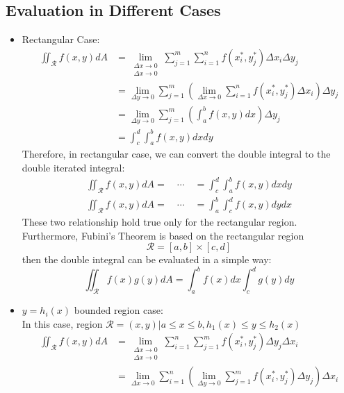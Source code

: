 \documentclass[UTF8,a4paper, 10pt, openany]{book}
\begin{document}
\subsection{Evaluation in Different Cases}
\begin{itemize}
\item Rectangular Case:
\begin{align*}
\iint_{\mathcal{R}}f(x,y)dA &= \lim_{\substack{\Delta x\to 0\\ \Delta x\to 0}}\displaystyle\sum_{j=1}^{m}\displaystyle\sum_{i=1}^{n} f(x_i^*,y_j^*)\Delta x_{i}\Delta y_{j}\\
&= \lim_{\Delta y\to 0}\displaystyle\sum_{j=1}^{m}\left(\lim_{\Delta x\to 0}\displaystyle\sum_{i=1}^{n} f(x_i^*,y_j^*)\Delta x_{i} \right)\Delta y_{j}\\
&= \lim_{\Delta y\to 0}\displaystyle\sum_{j=1}^{m}\left(\displaystyle\int_{a}^{b}f(x,y)dx \right)\Delta y_{j}\\
&= \displaystyle\int_{c}^{d}\displaystyle\int_{a}^{b}f(x,y)dxdy
\end{align*}
Therefore, in rectangular case, we can convert the double integral to the double iterated integral:
\begin{align*}
\iint_{\mathcal{R}}f(x,y)dA =\quad \cdots \quad=\displaystyle\int_{c}^{d}\displaystyle\int_{a}^{b}f(x,y)dxdy \\
\iint_{\mathcal{R}}f(x,y)dA =\quad \cdots \quad=\displaystyle\int_{a}^{b}\displaystyle\int_{c}^{d}f(x,y)dydx
\end{align*}
These two relationship hold true only for the rectangular region.\\
Furthermore, Fubini's Theorem is based on the rectangular region
$$\mathcal{R}=[a,b]\times [c,d]$$
then the double integral can be evaluated in a simple way:
$$\iint_{\mathcal{R}}f(x)g(y)dA=\int_{a}^{b}f(x)dx\int_{c}^{d}g(y)dy$$
\item $y=h_{i}(x)$ bounded region case:\\
In this case, region $\mathcal{R}={(x,y)|a\leq x\leq b, h_{1}(x)\leq y\leq h_{2}(x)}$
\begin{align*}
\iint_{\mathcal{R}}f(x,y)dA &= \lim_{\substack{\Delta x\to 0\\ \Delta x\to 0}}\displaystyle\sum_{i=1}^{n}\displaystyle\sum_{j=1}^{m} f(x_i^*,y_j^*)\Delta y_{j}\Delta x_{i}\\
&= \lim_{\Delta x\to 0}\displaystyle\sum_{i=1}^{n}\left(\lim_{\Delta y\to 0}\displaystyle\sum_{j=1}^{m} f(x_i^*,y_j^*)\Delta y_{j} \right)\Delta x_{i}\\

\end{align*}
\end{itemize}
\end{document}
